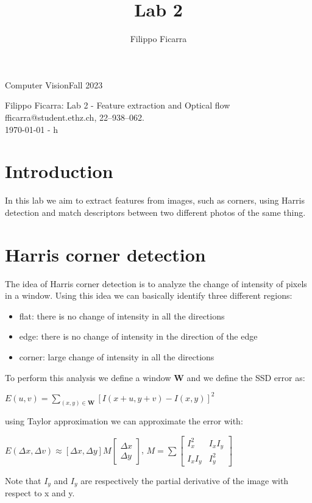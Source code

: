 \documentclass{ETHExercise}
\title{Lab 2}
\author{Filippo Ficarra}
\newcommand{\timestamp}{\ddmmyyyydate\today \,\,- \currenttime h}
\begin{document}
{}
{\Large Computer Vision}{Fall 2023}
\begin{center}
    {\Huge Filippo Ficarra: Lab 2 - Feature extraction and Optical flow }\\
      \quad\newline
      fficarra@student.ethz.ch, 22--938--062.\\
      \quad\newline
      \timestamp
      \end{center}

\section{Introduction}
In this lab we aim to extract features from images, 
such as corners, using Harris detection and match descriptors 
between two different photos of the same thing.

\section{Harris corner detection}
The idea of Harris corner detection is to analyze the change
of intensity of pixels in a window. Using this idea we can 
basically identify three different regions:
\begin{itemize}
  \item flat: there is no change of intensity in all the directions
  \item edge: there is no change of intensity in the direction of the edge
  \item corner: large change of intensity in all the directions
\end{itemize}

To perform this analysis we define a window $\bm{W}$ and we define
the SSD error as:
\begin{center}
  $E(u, v) = \sum\limits_{(x, y) \in \bm{W}} \left[I(x+u, y+v) - I(x, y)\right]^2$
\end{center}
using Taylor approximation we can approximate the error with:
\begin{center}
  $E(\Delta x, \Delta v) \approx \left[\Delta x, \Delta y\right] M \begin{bmatrix}
    \Delta x\\
    \Delta y
  \end{bmatrix}$, $M = \sum \begin{bmatrix}
    I_x^2 & I_xI_y\\
    I_xI_y & I_y^2
  \end{bmatrix}$
\end{center}
Note that $I_y$ and $I_y$ are respectively the partial derivative of the image
with respect to x and y.
\end{document}
